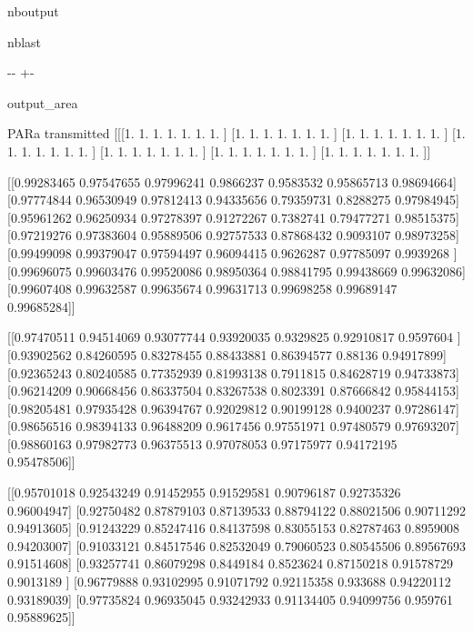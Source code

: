 \documentclass[letterpaper,10pt,english]{sphinxmanual}
\begin{document}
\begin{sphinxuseclass}{nboutput}
\begin{sphinxuseclass}{nblast}
{

\kern-\sphinxverbatimsmallskipamount\kern-\baselineskip
\kern+\FrameHeightAdjust\kern-\fboxrule
\vspace{\nbsphinxcodecellspacing}

\begin{sphinxuseclass}{output_area}
\begin{sphinxuseclass}{}


\begin{sphinxVerbatim}[commandchars=\\\{\}]
PARa transmitted
[[[1.         1.         1.         1.         1.         1.
   1.        ]
  [1.         1.         1.         1.         1.         1.
   1.        ]
  [1.         1.         1.         1.         1.         1.
   1.        ]
  [1.         1.         1.         1.         1.         1.
   1.        ]
  [1.         1.         1.         1.         1.         1.
   1.        ]
  [1.         1.         1.         1.         1.         1.
   1.        ]
  [1.         1.         1.         1.         1.         1.
   1.        ]]

 [[0.99283465 0.97547655 0.97996241 0.9866237  0.9583532  0.95865713
   0.98694664]
  [0.97774844 0.96530949 0.97812413 0.94335656 0.79359731 0.8288275
   0.97984945]
  [0.95961262 0.96250934 0.97278397 0.91272267 0.7382741  0.79477271
   0.98515375]
  [0.97219276 0.97383604 0.95889506 0.92757533 0.87868432 0.9093107
   0.98973258]
  [0.99499098 0.99379047 0.97594497 0.96094415 0.9626287  0.97785097
   0.9939268 ]
  [0.99696075 0.99603476 0.99520086 0.98950364 0.98841795 0.99438669
   0.99632086]
  [0.99607408 0.99632587 0.99635674 0.99631713 0.99698258 0.99689147
   0.99685284]]

 [[0.97470511 0.94514069 0.93077744 0.93920035 0.9329825  0.92910817
   0.9597604 ]
  [0.93902562 0.84260595 0.83278455 0.88433881 0.86394577 0.88136
   0.94917899]
  [0.92365243 0.80240585 0.77352939 0.81993138 0.7911815  0.84628719
   0.94733873]
  [0.96214209 0.90668456 0.86337504 0.83267538 0.8023391  0.87666842
   0.95844153]
  [0.98205481 0.97935428 0.96394767 0.92029812 0.90199128 0.9400237
   0.97286147]
  [0.98656516 0.98394133 0.96488209 0.9617456  0.97551971 0.97480579
   0.97693207]
  [0.98860163 0.97982773 0.96375513 0.97078053 0.97175977 0.94172195
   0.95478506]]

 [[0.95701018 0.92543249 0.91452955 0.91529581 0.90796187 0.92735326
   0.96004947]
  [0.92750482 0.87879103 0.87139533 0.88794122 0.88021506 0.90711292
   0.94913605]
  [0.91243229 0.85247416 0.84137598 0.83055153 0.82787463 0.8959008
   0.94203007]
  [0.91033121 0.84517546 0.82532049 0.79060523 0.80545506 0.89567693
   0.91514608]
  [0.93257741 0.86079298 0.8449184  0.8523624  0.87150218 0.91578729
   0.9013189 ]
  [0.96779888 0.93102995 0.91071792 0.92115358 0.933688   0.94220112
   0.93189039]
  [0.97735824 0.96935045 0.93242933 0.91134405 0.94099756 0.959761
   0.95889625]]


\end{sphinxVerbatim}
\end{sphinxuseclass}
\end{sphinxuseclass}}
\end{sphinxuseclass}
\end{sphinxuseclass}
\end{document}
